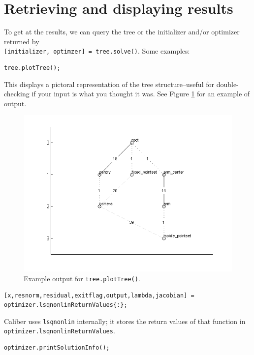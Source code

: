 \section{Retrieving and displaying results} \label{disp_results}

To get at the results, we can query the tree or the initializer and/or optimizer returned by \\
\texttt{[initializer, optimzer] = tree.solve()}.
Some examples:

\begin{verbatim}
tree.plotTree();
\end{verbatim}

This displays a pictoral representation of the tree structure--useful for double-checking
if your input is what you thought it was.
See Figure \ref{fig:tree_example} for an example of output.

\begin{figure}[t]
\includegraphics{figures/tree_example}
\caption{Example output for \texttt{tree.plotTree()}.}
\label{fig:tree_example}
\end{figure}

\begin{verbatim}
[x,resnorm,residual,exitflag,output,lambda,jacobian] = optimizer.lsqnonlinReturnValues{:};
\end{verbatim}

Caliber uses \texttt{lsqnonlin} internally; it stores the return values of that function in \texttt{optimizer.lsqnonlinReturnValues}.

\begin{verbatim}
optimizer.printSolutionInfo();
\end{verbatim}

